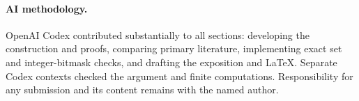 \documentclass[acmsmall,screen,nonacm,11pt]{acmart}
\begin{document}
\paragraph{AI methodology.}
OpenAI Codex contributed substantially to all sections: developing the
construction and proofs, comparing primary literature, implementing exact
set and integer-bitmask checks, and drafting the exposition and LaTeX.
Separate Codex contexts checked the argument and finite computations.
Responsibility for any submission and its content remains with the named author.



\end{document}
